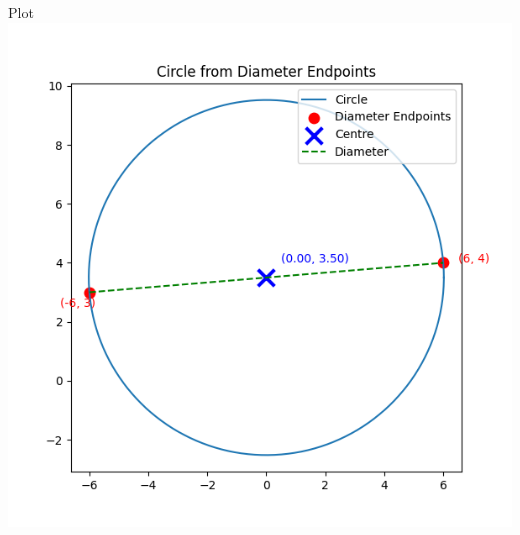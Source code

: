 \documentclass{beamer}
\begin{document}
\begin{frame}{Plot}
    \centering
    \includegraphics[width=3\columnwidth, height=0.8\textheight, keepaspectratio]{figs/Figure_1.png}     
\end{frame}
\end{document}
